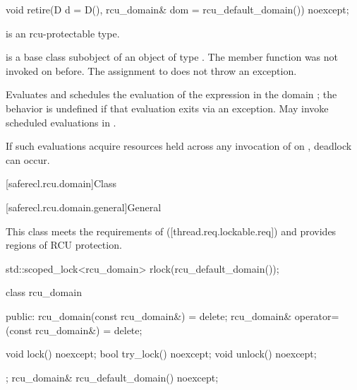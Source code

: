 \begin{itemdecl}
void retire(D d = D(), rcu_domain& dom = rcu_default_domain()) noexcept;
\end{itemdecl}

\begin{itemdescr}

\pnum
\mandates
{} is an rcu-protectable type.

\pnum
\expects
{} is a base class subobject of
an object  of type . The member function
 was not invoked on 
before. The assignment to  does not throw an
exception.

\pnum
\effects
Evaluates  and schedules the
evaluation of the expression  in
the domain ; the behavior is undefined if that evaluation
exits via an exception.
May invoke scheduled evaluations in .

\begin{note}
If such evaluations acquire resources held across any invocation of
 on , deadlock can occur.
\end{note}

\end{itemdescr}

[saferecl.rcu.domain]{Class }

[saferecl.rcu.domain.general]{General}

This class meets the requirements of 
([thread.req.lockable.req]) and provides regions of RCU protection.

\begin{example}
\begin{codeblock}
std::scoped_lock<rcu_domain> rlock(rcu_default_domain());
\end{codeblock}
\end{example}

\begin{codeblock}
class rcu_domain {
public:
  rcu_domain(const rcu_domain&) = delete;
  rcu_domain& operator=(const rcu_domain&) = delete;

  void lock() noexcept;
  bool try_lock() noexcept;
  void unlock() noexcept;
};
rcu_domain& rcu_default_domain() noexcept;
\end{codeblock}

